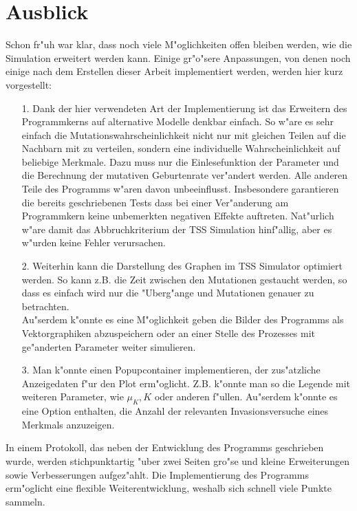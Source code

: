 \documentclass[11pt, a4paper, german]{article}
\theoremstyle{plain}
\begin{document}
\section{Ausblick}
Schon fr"uh war klar, dass noch viele M"oglichkeiten offen bleiben werden, wie die Simulation erweitert werden kann. Einige gr"o"sere Anpassungen, von denen noch einige nach dem Erstellen dieser Arbeit implementiert werden, werden hier kurz vorgestellt:
\begin{itemize}
	\item[1.] Dank der hier verwendeten Art der Implementierung ist das Erweitern des Programmkerns auf alternative Modelle denkbar einfach. So w"are es sehr einfach die Mutationswahrscheinlichkeit nicht nur mit gleichen Teilen auf die Nachbarn mit zu verteilen, sondern eine individuelle Wahrscheinlichkeit auf beliebige Merkmale. Dazu muss nur die Einlesefunktion der Parameter und die Berechnung der mutativen Geburtenrate ver"andert werden. Alle anderen Teile des Programms w"aren davon unbeeinflusst. Insbesondere garantieren die bereits geschriebenen Tests dass bei einer Ver"anderung am Programmkern keine unbemerkten negativen Effekte auftreten. Nat"urlich w"are damit das Abbruchkriterium der TSS Simulation hinf"allig, aber es w"urden keine Fehler verursachen.
	\item[2.] Weiterhin kann die Darstellung des Graphen im TSS Simulator optimiert werden. So kann z.B. die Zeit zwischen den Mutationen gestaucht werden, so dass es einfach wird nur die "Uberg"ange und Mutationen genauer zu betrachten. \\
	Au"serdem k"onnte es eine M"oglichkeit geben die Bilder des Programms als Vektorgraphiken abzuspeichern oder an einer Stelle des Prozesses mit ge"anderten Parameter weiter simulieren.
	\item[3.] Man k"onnte einen Popupcontainer implementieren, der zus"atzliche Anzeigedaten f"ur den Plot erm"oglicht. Z.B. k"onnte man so die Legende mit weiteren Parameter, wie $ \mu_K, K $ oder anderen f"ullen. Au"serdem k"onnte es eine Option enthalten, die Anzahl der relevanten Invasionsversuche eines Merkmals anzuzeigen.\\
\end{itemize}
In einem Protokoll, das neben der Entwicklung des Programms geschrieben wurde, werden stichpunktartig "uber zwei Seiten gro"se und kleine Erweiterungen sowie Verbesserungen aufgez"ahlt. Die Implementierung des Programms erm"oglicht eine flexible Weiterentwicklung, weshalb sich schnell viele Punkte sammeln.


\clearpage

\end{document}
